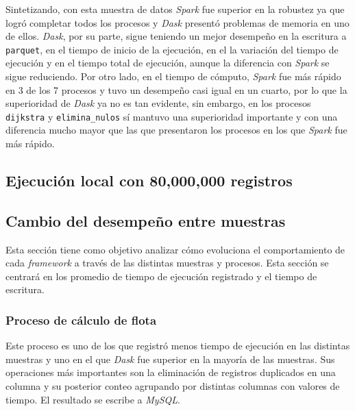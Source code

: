 Sintetizando, con esta muestra de datos \textit{Spark} fue superior en la robustez ya que logró completar todos los procesos y \textit{Dask} presentó problemas de memoria en uno de ellos. \textit{Dask}, por su parte, sigue teniendo un mejor desempeño en la escritura a \texttt{parquet}, en el tiempo de inicio de la ejecución, en el la variación del tiempo de ejecución y en el tiempo total de ejecución, aunque la diferencia con \textit{Spark} se sigue reduciendo. Por otro lado, en el tiempo de cómputo, \textit{Spark} fue más rápido en 3 de los 7 procesos y tuvo un desempeño casi igual en un cuarto, por lo que la superioridad de \textit{Dask} ya no es tan evidente, sin embargo, en los procesos \texttt{dijkstra} y \texttt{elimina\_nulos} sí mantuvo una superioridad importante y con una diferencia mucho mayor que las que presentaron los procesos en los que \textit{Spark} fue más rápido.

\subsection{Ejecución local con 80,000,000 registros}


\subsection{Cambio del desempeño entre muestras}

Esta sección tiene como objetivo analizar cómo evoluciona el comportamiento de cada \textit{framework} a través de las distintas muestras y procesos. Esta sección se centrará en los promedio de tiempo de ejecución registrado y el tiempo de escritura.

\subsubsection{Proceso de cálculo de flota}

Este proceso es uno de los que registró menos tiempo de ejecución en las distintas muestras y uno en el que \textit{Dask} fue superior en la mayoría de las muestras. Sus operaciones más importantes son la eliminación de registros duplicados en una columna y su posterior conteo agrupando por distintas columnas con valores de tiempo. El resultado se escribe a \textit{MySQL}.

